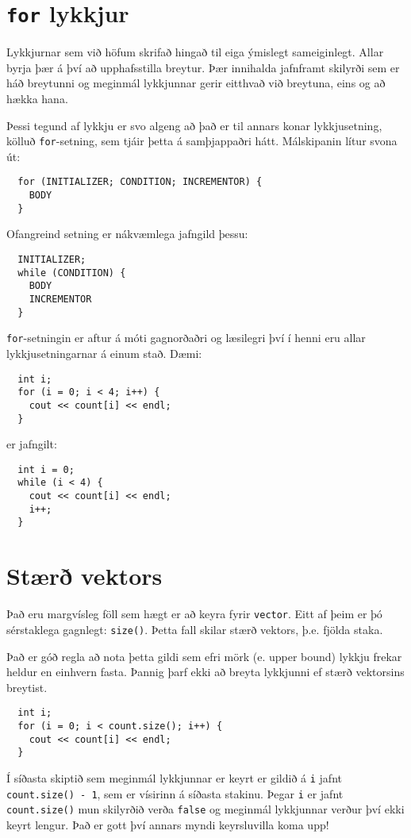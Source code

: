 \section{{\tt for} lykkjur}

Lykkjurnar sem við höfum skrifað hingað til eiga ýmislegt sameiginlegt.
Allar byrja þær á því að upphafsstilla breytur.
Þær innihalda jafnframt skilyrði sem er háð breytunni og meginmál lykkjunnar gerir eitthvað við breytuna, eins og að hækka hana. 


Þessi tegund af lykkju er svo algeng að það er til annars konar lykkjusetning, kölluð {\tt for}-setning, sem tjáir þetta á samþjappaðri hátt.
Málskipanin lítur svona út:

\begin{verbatim}
  for (INITIALIZER; CONDITION; INCREMENTOR) {
    BODY
  }
\end{verbatim}
%
Ofangreind setning er nákvæmlega jafngild þessu:

\begin{verbatim}
  INITIALIZER;
  while (CONDITION) {
    BODY
    INCREMENTOR
  }
\end{verbatim}
%
{\tt for}-setningin er aftur á móti gagnorðaðri og læsilegri því í henni eru allar lykkjusetningarnar á einum stað.
Dæmi:

\begin{verbatim}
  int i;
  for (i = 0; i < 4; i++) {
    cout << count[i] << endl;
  }
\end{verbatim}
%
er jafngilt:

\begin{verbatim}
  int i = 0;
  while (i < 4) {
    cout << count[i] << endl;
    i++;
  }
\end{verbatim}

\section{Stærð vektors}

Það eru margvísleg föll sem hægt er að keyra fyrir {\tt vector}.
Eitt af þeim er þó sérstaklega gagnlegt: {\tt size()}.
Þetta fall skilar stærð vektors, þ.e. fjölda staka.

Það er góð regla að nota þetta gildi sem efri mörk (e. upper bound) lykkju frekar heldur en einhvern fasta.
Þannig þarf ekki að breyta lykkjunni ef stærð vektorsins breytist.

\begin{verbatim}
  int i;
  for (i = 0; i < count.size(); i++) {
    cout << count[i] << endl;
  }
\end{verbatim}
%
Í síðasta skiptið sem meginmál lykkjunnar er keyrt er gildið á {\tt i} jafnt {\tt count.size() - 1}, sem er vísirinn á síðasta stakinu.
Þegar {\tt i} er jafnt {\tt count.size()} mun skilyrðið verða {\tt false} og meginmál lykkjunnar verður því ekki keyrt lengur.
Það er gott því annars myndi keyrsluvilla koma upp!

